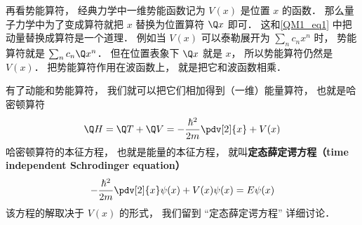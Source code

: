 再看势能算符， 经典力学中一维势能函数记为 $V(x)$ 是位置 $x$ 的函数． 那么量子力学中为了变成算符就把 $x$ 替换为位置算符 $\Q x$ 即可． 这和\autoref{QM1_eq1} 中把动量替换成算符是一个道理． 例如当 $V(x)$ 可以泰勒展开为 $\sum_n c_n x^n$ 时， 势能算符就是 $\sum_n c_n \Q x^n$． 但在位置表象下 $\Q x$ 就是 $x$， 所以势能算符仍然是 $V(x)$． 把势能算符作用在波函数上， 就是把它和波函数相乘．

有了动能和势能算符， 我们就可以把它们相加得到（一维）能量算符， 也就是哈密顿算符
\begin{equation}
\Q H = \Q T + \Q V = -\frac{\hbar^2}{2m} \pdv[2]{x} + V(x)
\end{equation}
哈密顿算符的本征方程， 也就是能量的本征方程， 就叫\textbf{定态薛定谔方程（time independent Schrodinger equation）}
\begin{equation}
-\frac{\hbar^2}{2m} \pdv[2]{x}\psi(x) + V(x)\psi(x) = E\psi(x)
\end{equation}
该方程的解取决于 $V(x)$ 的形式， 我们留到 “定态薛定谔方程” 详细讨论．

